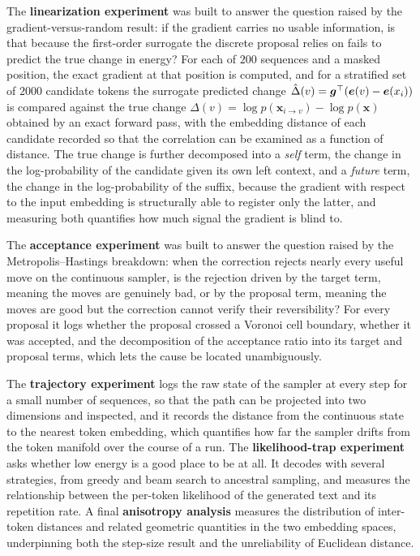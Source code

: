 The \textbf{linearization experiment} was built to answer the question raised by the gradient-versus-random result: if the gradient carries no usable information, is that because the first-order surrogate the discrete proposal relies on fails to predict the true change in energy? For each of $200$ sequences and a masked position, the exact gradient at that position is computed, and for a stratified set of $2000$ candidate tokens the surrogate predicted change $\hat{\Delta}(v) = \bm{g}^\top(\bm{e}(v) - \bm{e}(x_i))$ is compared against the true change $\Delta(v) = \log p(\bm{x}_{i\to v}) - \log p(\bm{x})$ obtained by an exact forward pass, with the embedding distance of each candidate recorded so that the correlation can be examined as a function of distance. The true change is further decomposed into a \emph{self} term, the change in the log-probability of the candidate given its own left context, and a \emph{future} term, the change in the log-probability of the suffix, because the gradient with respect to the input embedding is structurally able to register only the latter, and measuring both quantifies how much signal the gradient is blind to.

The \textbf{acceptance experiment} was built to answer the question raised by the Metropolis--Hastings breakdown: when the correction rejects nearly every useful move on the continuous sampler, is the rejection driven by the target term, meaning the moves are genuinely bad, or by the proposal term, meaning the moves are good but the correction cannot verify their reversibility? For every proposal it logs whether the proposal crossed a Voronoi cell boundary, whether it was accepted, and the decomposition of the acceptance ratio into its target and proposal terms, which lets the cause be located unambiguously.

The \textbf{trajectory experiment} logs the raw state of the sampler at every step for a small number of sequences, so that the path can be projected into two dimensions and inspected, and it records the distance from the continuous state to the nearest token embedding, which quantifies how far the sampler drifts from the token manifold over the course of a run. The \textbf{likelihood-trap experiment} asks whether low energy is a good place to be at all. It decodes with several strategies, from greedy and beam search to ancestral sampling, and measures the relationship between the per-token likelihood of the generated text and its repetition rate. A final \textbf{anisotropy analysis} measures the distribution of inter-token distances and related geometric quantities in the two embedding spaces, underpinning both the step-size result and the unreliability of Euclidean distance.

